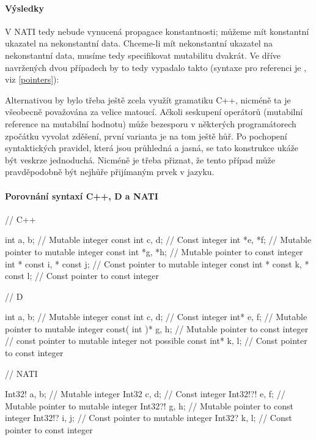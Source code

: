 \paragraph{Výsledky} V NATI tedy nebude vynucená propagace konstantnosti; můžeme mít konstantní ukazatel na nekonstantní data. Chceme-li mít nekonstantní ukazatel na nekonstantní data, musíme tedy specifikovat mutabilitu dvakrát. Ve dříve navržených dvou případech by to tedy vypadalo takto (syntaxe pro referenci je , viz \ref{pointers}):
\begin{compactenum}
	\item {}
	\item {}
\end{compactenum}

Alternativou by bylo třeba ještě zcela využít gramatiku C++, nicméně ta je všeobecně považována za velice matoucí. Ačkoli seskupení operátorů  (mutabilní reference na mutabilní hodnotu) může bezesporu v některých programátorech zpočátku vyvolat zděšení, první varianta je na tom ještě hůř. Po pochopení syntaktických pravidel, která jsou průhledná a jasná, se tato konstrukce ukáže být veskrze jednoduchá. Nicméně je třeba přiznat, že tento případ může pravděpodobně být nejhůře přijímaným prvek v jazyku.

\paragraph{Porovnání syntaxí C++, D a NATI}
\begin{cppcode}
// C++

int a, b; // Mutable integer
const int c, d; // Const integer
int *e, *f; // Mutable pointer to mutable integer
const int *g, *h; // Mutable pointer to const integer
int * const i, * const j; // Const pointer to mutable integer
const int * const k, * const l; // Const pointer to const integer

\end{cppcode}
\begin{dcode}
// D

int a, b; // Mutable integer
const int c, d; // Const integer
int* e, f; // Mutable pointer to mutable integer
const( int )* g, h; // Mutable pointer to const integer
// const pointer to mutable integer not possible
const int* k, l; // Const pointer to const integer
\end{dcode}
\begin{code}
// NATI

Int32! a, b; // Mutable integer
Int32 c, d; // Const integer
Int32!?! e, f; // Mutable pointer to mutable integer
Int32?! g, h; // Mutable pointer to const integer
Int32!? i, j; // Const pointer to mutable integer
Int32? k, l; // Const pointer to const integer
\end{code}

